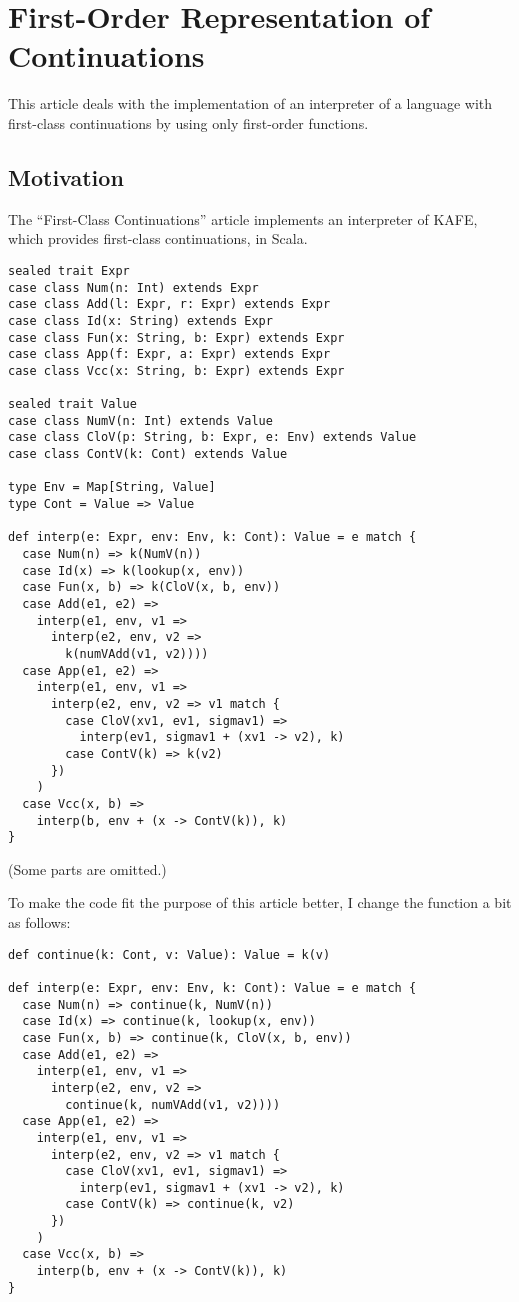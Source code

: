\setchapterpreamble[u]{\margintoc}
\chapter{First-Order Representation of Continuations}

This article deals with the implementation of an interpreter of a language with
first-class continuations by using only first-order functions.

\section{Motivation}

The “First-Class Continuations” article implements an interpreter of KAFE, which
provides first-class continuations, in Scala.

\begin{verbatim}
sealed trait Expr
case class Num(n: Int) extends Expr
case class Add(l: Expr, r: Expr) extends Expr
case class Id(x: String) extends Expr
case class Fun(x: String, b: Expr) extends Expr
case class App(f: Expr, a: Expr) extends Expr
case class Vcc(x: String, b: Expr) extends Expr

sealed trait Value
case class NumV(n: Int) extends Value
case class CloV(p: String, b: Expr, e: Env) extends Value
case class ContV(k: Cont) extends Value

type Env = Map[String, Value]
type Cont = Value => Value

def interp(e: Expr, env: Env, k: Cont): Value = e match {
  case Num(n) => k(NumV(n))
  case Id(x) => k(lookup(x, env))
  case Fun(x, b) => k(CloV(x, b, env))
  case Add(e1, e2) =>
    interp(e1, env, v1 =>
      interp(e2, env, v2 =>
        k(numVAdd(v1, v2))))
  case App(e1, e2) =>
    interp(e1, env, v1 =>
      interp(e2, env, v2 => v1 match {
        case CloV(xv1, ev1, sigmav1) =>
          interp(ev1, sigmav1 + (xv1 -> v2), k)
        case ContV(k) => k(v2)
      })
    )
  case Vcc(x, b) =>
    interp(b, env + (x -> ContV(k)), k)
}
\end{verbatim}

(Some parts are omitted.)

To make the code fit the purpose of this article better, I change the
 function a bit as follows:

\begin{verbatim}
def continue(k: Cont, v: Value): Value = k(v)

def interp(e: Expr, env: Env, k: Cont): Value = e match {
  case Num(n) => continue(k, NumV(n))
  case Id(x) => continue(k, lookup(x, env))
  case Fun(x, b) => continue(k, CloV(x, b, env))
  case Add(e1, e2) =>
    interp(e1, env, v1 =>
      interp(e2, env, v2 =>
        continue(k, numVAdd(v1, v2))))
  case App(e1, e2) =>
    interp(e1, env, v1 =>
      interp(e2, env, v2 => v1 match {
        case CloV(xv1, ev1, sigmav1) =>
          interp(ev1, sigmav1 + (xv1 -> v2), k)
        case ContV(k) => continue(k, v2)
      })
    )
  case Vcc(x, b) =>
    interp(b, env + (x -> ContV(k)), k)
}
\end{verbatim}

